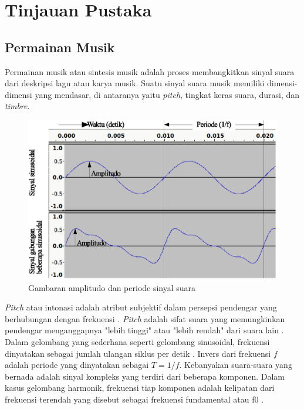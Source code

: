 \chapter{Tinjauan Pustaka}

\section{Permainan Musik}\label{section-music-performance}

Permainan musik atau sintesis musik adalah proses membangkitkan sinyal suara dari deskripsi lagu atau karya musik. Suatu sinyal suara musik memiliki dimensi-dimensi yang mendasar, di antaranya yaitu \textit{pitch}, tingkat keras suara, durasi, dan \textit{timbre}. \parencite{emilia2006tonaldesc}

\begin{figure}[htbp]
    \centering
    \includegraphics[width=\textwidth]{resources/sound-signal-example.eps}
    \caption{Gambaran amplitudo dan periode sinyal suara} \label{soundsignalexample}
\end{figure}

\textit{Pitch} atau intonasi adalah atribut subjektif dalam persepsi pendengar yang berhubungan dengan frekuensi \parencite{emilia2006tonaldesc}. \textit{Pitch} adalah sifat suara yang memungkinkan pendengar menganggapnya "lebih tinggi" atau "lebih rendah" dari suara lain \parencite{pitchneuralcoding}. Dalam gelombang yang sederhana seperti gelombang sinusoidal, frekuensi dinyatakan sebagai jumlah ulangan siklus per detik \parencite{grovedict}. Invers dari frekuensi $f$ adalah periode yang dinyatakan sebagai $T=1/f$. Kebanyakan suara-suara yang bernada adalah sinyal kompleks yang terdiri dari beberapa komponen. Dalam kasus gelombang harmonik, frekuensi tiap komponen adalah kelipatan dari frekuensi terendah yang disebut sebagai frekuensi fundamental atau f0 \parencite{emilia2006tonaldesc}.

